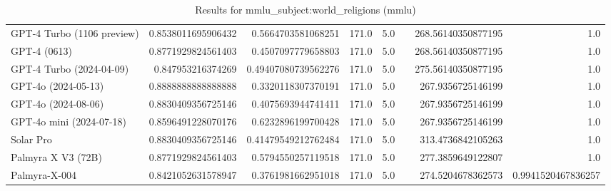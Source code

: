 \begin{table}[htp]
{\begin{tabular}{lrrrrrrr}
GPT-4 Turbo (1106 preview) & 0.8538011695906432 & 0.5664703581068251 & 171.0 & 5.0 &  & 268.56140350877195 & 1.0 \\
GPT-4 (0613) & 0.8771929824561403 & 0.4507097779658803 & 171.0 & 5.0 &  & 268.56140350877195 & 1.0 \\
GPT-4 Turbo (2024-04-09) & 0.847953216374269 & 0.49407080739562276 & 171.0 & 5.0 &  & 275.56140350877195 & 1.0 \\
GPT-4o (2024-05-13) & 0.8888888888888888 & 0.3320118307370191 & 171.0 & 5.0 &  & 267.9356725146199 & 1.0 \\
GPT-4o (2024-08-06) & 0.8830409356725146 & 0.4075693944741411 & 171.0 & 5.0 &  & 267.9356725146199 & 1.0 \\
GPT-4o mini (2024-07-18) & 0.8596491228070176 & 0.6232896199700428 & 171.0 & 5.0 &  & 267.9356725146199 & 1.0 \\
Solar Pro & 0.8830409356725146 & 0.41479549212762484 & 171.0 & 5.0 &  & 313.4736842105263 & 1.0 \\
Palmyra X V3 (72B) & 0.8771929824561403 & 0.5794550257119518 & 171.0 & 5.0 &  & 277.3859649122807 & 1.0 \\
Palmyra-X-004 & 0.8421052631578947 & 0.3761981662951018 & 171.0 & 5.0 &  & 274.5204678362573 & 0.9941520467836257 \\
\bottomrule
\end{tabular}}
\caption{Results for mmlu_subject:world_religions (mmlu)}
\label{fig:mmlu_subject:world_religions (mmlu)}
\end{table}